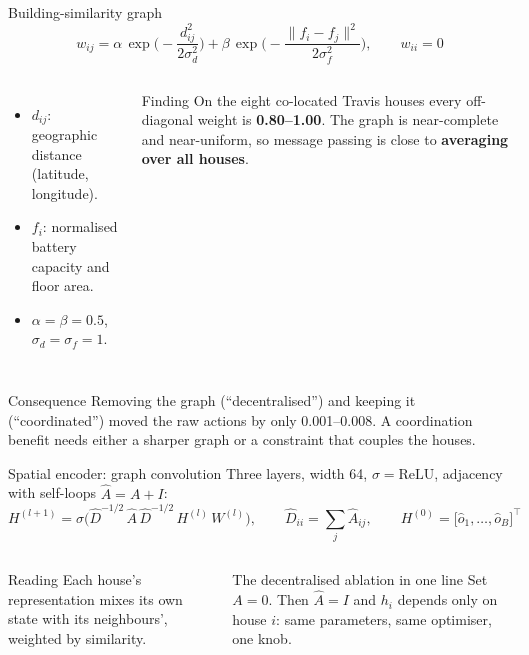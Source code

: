 \documentclass[aspectratio=169,10pt]{beamer}
\begin{document}
\begin{frame}{Building-similarity graph}
\[
w_{ij} = \alpha\,\exp\!\Big(-\frac{d_{ij}^2}{2\sigma_d^2}\Big) + \beta\,\exp\!\Big(-\frac{\|f_i - f_j\|^2}{2\sigma_f^2}\Big),
\qquad w_{ii} = 0
\]
\begin{columns}[T]
\begin{itemize}
  \item $d_{ij}$: geographic distance (latitude, longitude).
  \item $f_i$: normalised battery capacity and floor area.
  \item $\alpha = \beta = 0.5$, \ $\sigma_d = \sigma_f = 1$.
\end{itemize}
\begin{alertblock}{Finding}
On the eight co-located Travis houses every off-diagonal weight is \textbf{0.80--1.00}. The graph is near-complete and near-uniform, so message passing is close to \textbf{averaging over all houses}.
\end{alertblock}
\end{columns}
\vspace{0.4em}
\begin{block}{Consequence}
Removing the graph (``decentralised'') and keeping it (``coordinated'') moved the raw actions by only 0.001--0.008. A coordination benefit needs either a sharper graph or a constraint that couples the houses.
\end{block}
\end{frame}

\begin{frame}{Spatial encoder: graph convolution}
Three layers, width 64, $\sigma = \mathrm{ReLU}$, adjacency with self-loops $\hat A = A + I$:
\[
H^{(l+1)} = \sigma\Big(\hat D^{-1/2}\,\hat A\,\hat D^{-1/2}\, H^{(l)}\, W^{(l)}\Big),
\qquad \hat D_{ii} = \sum_j \hat A_{ij},
\qquad H^{(0)} = \big[\hat o_1, \dots, \hat o_B\big]^\top
\]
\vspace{0.3em}
\begin{columns}[T]
\begin{block}{Reading}
Each house's representation mixes its own state with its neighbours', weighted by similarity.
\end{block}
\begin{block}{The decentralised ablation in one line}
Set $A = 0$. Then $\hat A = I$ and $h_i$ depends only on house $i$: same parameters, same optimiser, one knob.
\end{block}
\end{columns}
\end{frame}
\end{document}

